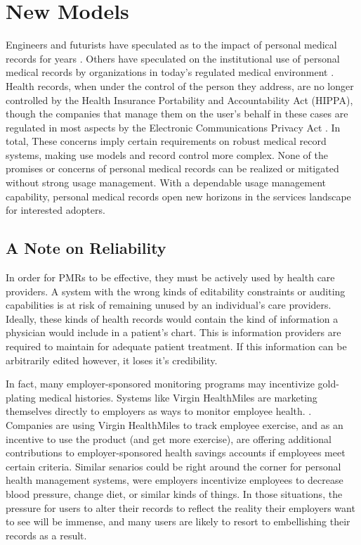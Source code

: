 \documentclass[10pt, conference, compsocconf]{IEEEtran}
\begin{document}
\section{New Models}
Engineers and futurists have speculated as to the impact of personal medical records for years \cite{Emr:Web:BestCaseEMR,Emr:Web:WorstCaseEMR}.  Others have speculated on the institutional use of personal medical records by organizations in today's regulated medical environment \cite{Emr:doi:10.1056/NEJMc081118}.  Health records, when under the control of the person they address, are no longer controlled by the Health Insurance Portability and Accountability Act (HIPPA), though the companies that manage them on the user's behalf in these cases are regulated in most aspects by the Electronic Communications Privacy Act \cite{Emr:doi:10.1056/NEJMsb0800220}.  In total, These concerns imply certain requirements on robust medical record systems, making use models and record control more complex.  None of the promises or concerns of personal medical records can be realized or mitigated without strong usage management.  With a dependable usage management capability, personal medical records open new horizons in the services landscape for interested adopters.

\subsection{A Note on Reliability}
In order for PMRs to be effective, they must be actively used by health care providers.  A system with the wrong kinds of editability constraints or auditing capabilities is at risk of remaining unused by an individual's care providers.  Ideally, these kinds of health records would contain the kind of information a physician would include in a patient's chart.  This is information providers are required to maintain for adequate patient treatment.  If this information can be arbitrarily edited however, it loses it's credibility.

In fact, many employer-sponsored monitoring programs may incentivize gold-plating medical histories.  Systems like Virgin HealthMiles are marketing themselves directly to employers as ways to monitor employee health. \cite{Emr:Web:VirginHealthMiles}.  Companies are using Virgin HealthMiles to track employee exercise, and as an incentive to use the product (and get more exercise), are offering additional contributions to employer-sponsored health savings accounts if employees meet certain criteria.  Similar senarios could be right around the corner for personal health management systems, were employers incentivize employees to decrease blood pressure, change diet, or similar kinds of things.  In those situations, the pressure for users to alter their records to reflect the reality their employers want to see will be immense, and many users are likely to resort to embellishing their records as a result.
\end{document}
